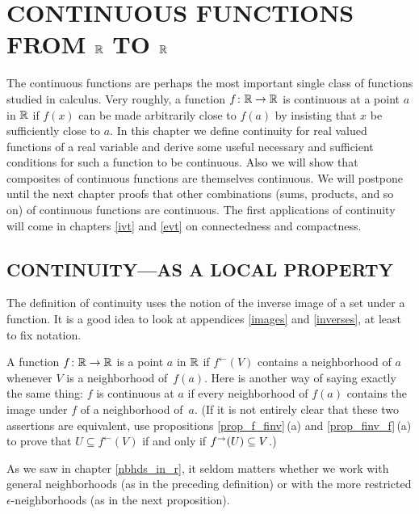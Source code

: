 \chapter{CONTINUOUS FUNCTIONS FROM $\mathbb{R}$ TO $\mathbb{R}$}\label{cont_on_R}


The continuous functions are perhaps the most important single class of functions studied in
calculus.  Very roughly, a function $f\colon\mathbb{R} \rightarrow \mathbb{R}$ is continuous at a point $a$ in $\mathbb{R}$
if $f(x)$ can be made arbitrarily close to $f(a)$ by insisting that $x$ be sufficiently close
to $a$.  In this chapter we define continuity for real valued functions of a real variable and
derive some useful necessary and sufficient conditions for such a function to be continuous.
Also we will show that composites of continuous functions are themselves continuous.  We will
postpone until the next chapter proofs that other combinations (sums, products, and so on) of
continuous functions are continuous.  The first applications of continuity will come in
chapters \ref{ivt} and \ref{evt} on connectedness and compactness.





\section{CONTINUITY---AS A LOCAL PROPERTY}
The definition of continuity uses the notion of the inverse image of a set under a function.
It is a good idea to look at appendices \ref{images} and \ref{inverses}, at least to fix
notation.

\begin{defn}\label{df_continuity} A function $f\colon\mathbb{R} \rightarrow \mathbb{R}$ is
 a point $a$ in $\mathbb{R}$ if $f^\gets(V)$ contains a neighborhood of $a$ whenever
$V$ is a neighborhood of~$f(a)$. Here is another way of saying exactly the same thing: $f$ is
continuous at $a$ if every neighborhood of $f(a)$ contains the image under $f$ of a
neighborhood of~$a$.  (If it is not entirely clear that these two assertions are equivalent,
use propositions \ref{prop_f_finv}\,(a) and \ref{prop_finv_f}\,(a) to prove that $U \subseteq
f^\gets(V)$ if and only if $f^\rightarrow(U) \subseteq V$.)
\end{defn}

As we saw in chapter \ref{nbhds_in_r}, it seldom matters whether we work with general
neighborhoods (as in the preceding definition) or with the more restricted
$\epsilon$-neighborhoods (as in the next proposition).

